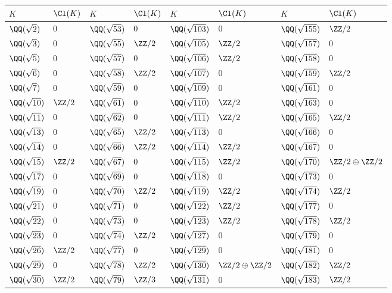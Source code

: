 \begin{center}
\renewcommand{\arraystretch}{1.5}
\begin{tabular}{x{1.5cm}x{1.5cm}x{1.5cm}x{1.5cm}x{1.5cm}x{1.5cm}x{1.5cm}x{1.5cm}}
\hline
$K$ & $\Cl (K)$ & $K$ & $\Cl (K)$ & $K$ & $\Cl (K)$ & $K$ & $\Cl (K)$ \tabularnewline\hline
$\QQ (\sqrt{2})$ & $0$ & $\QQ (\sqrt{53})$ & $0$ & $\QQ (\sqrt{103})$ & $0$ & $\QQ (\sqrt{155})$ & $\ZZ/2$ \tabularnewline\hline
$\QQ (\sqrt{3})$ & $0$ & $\QQ (\sqrt{55})$ & $\ZZ/2$ & $\QQ (\sqrt{105})$ & $\ZZ/2$ & $\QQ (\sqrt{157})$ & $0$ \tabularnewline\hline
$\QQ (\sqrt{5})$ & $0$ & $\QQ (\sqrt{57})$ & $0$ & $\QQ (\sqrt{106})$ & $\ZZ/2$ & $\QQ (\sqrt{158})$ & $0$ \tabularnewline\hline
$\QQ (\sqrt{6})$ & $0$ & $\QQ (\sqrt{58})$ & $\ZZ/2$ & $\QQ (\sqrt{107})$ & $0$ & $\QQ (\sqrt{159})$ & $\ZZ/2$ \tabularnewline\hline
$\QQ (\sqrt{7})$ & $0$ & $\QQ (\sqrt{59})$ & $0$ & $\QQ (\sqrt{109})$ & $0$ & $\QQ (\sqrt{161})$ & $0$ \tabularnewline\hline
$\QQ (\sqrt{10})$ & $\ZZ/2$ & $\QQ (\sqrt{61})$ & $0$ & $\QQ (\sqrt{110})$ & $\ZZ/2$ & $\QQ (\sqrt{163})$ & $0$ \tabularnewline\hline
$\QQ (\sqrt{11})$ & $0$ & $\QQ (\sqrt{62})$ & $0$ & $\QQ (\sqrt{111})$ & $\ZZ/2$ & $\QQ (\sqrt{165})$ & $\ZZ/2$ \tabularnewline\hline
$\QQ (\sqrt{13})$ & $0$ & $\QQ (\sqrt{65})$ & $\ZZ/2$ & $\QQ (\sqrt{113})$ & $0$ & $\QQ (\sqrt{166})$ & $0$ \tabularnewline\hline
$\QQ (\sqrt{14})$ & $0$ & $\QQ (\sqrt{66})$ & $\ZZ/2$ & $\QQ (\sqrt{114})$ & $\ZZ/2$ & $\QQ (\sqrt{167})$ & $0$ \tabularnewline\hline
$\QQ (\sqrt{15})$ & $\ZZ/2$ & $\QQ (\sqrt{67})$ & $0$ & $\QQ (\sqrt{115})$ & $\ZZ/2$ & $\QQ (\sqrt{170})$ & $\ZZ/2\oplus\ZZ/2$ \tabularnewline\hline
$\QQ (\sqrt{17})$ & $0$ & $\QQ (\sqrt{69})$ & $0$ & $\QQ (\sqrt{118})$ & $0$ & $\QQ (\sqrt{173})$ & $0$ \tabularnewline\hline
$\QQ (\sqrt{19})$ & $0$ & $\QQ (\sqrt{70})$ & $\ZZ/2$ & $\QQ (\sqrt{119})$ & $\ZZ/2$ & $\QQ (\sqrt{174})$ & $\ZZ/2$ \tabularnewline\hline
$\QQ (\sqrt{21})$ & $0$ & $\QQ (\sqrt{71})$ & $0$ & $\QQ (\sqrt{122})$ & $\ZZ/2$ & $\QQ (\sqrt{177})$ & $0$ \tabularnewline\hline
$\QQ (\sqrt{22})$ & $0$ & $\QQ (\sqrt{73})$ & $0$ & $\QQ (\sqrt{123})$ & $\ZZ/2$ & $\QQ (\sqrt{178})$ & $\ZZ/2$ \tabularnewline\hline
$\QQ (\sqrt{23})$ & $0$ & $\QQ (\sqrt{74})$ & $\ZZ/2$ & $\QQ (\sqrt{127})$ & $0$ & $\QQ (\sqrt{179})$ & $0$ \tabularnewline\hline
$\QQ (\sqrt{26})$ & $\ZZ/2$ & $\QQ (\sqrt{77})$ & $0$ & $\QQ (\sqrt{129})$ & $0$ & $\QQ (\sqrt{181})$ & $0$ \tabularnewline\hline
$\QQ (\sqrt{29})$ & $0$ & $\QQ (\sqrt{78})$ & $\ZZ/2$ & $\QQ (\sqrt{130})$ & $\ZZ/2\oplus\ZZ/2$ & $\QQ (\sqrt{182})$ & $\ZZ/2$ \tabularnewline\hline
$\QQ (\sqrt{30})$ & $\ZZ/2$ & $\QQ (\sqrt{79})$ & $\ZZ/3$ & $\QQ (\sqrt{131})$ & $0$ & $\QQ (\sqrt{183})$ & $\ZZ/2$ \tabularnewline\hline

\end{tabular}
\end{center}

